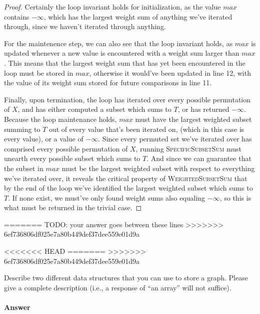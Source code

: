 \documentclass{article}
\begin{document}
\begin{enumerate}
\begin{proof}
			Certainly the loop invariant holds for initialization, as the value $max$ contains $-\infty$, which has
			the largest weight sum of anything we've iterated through, since we haven't iterated through anything.

			For the maintenence step, we can also see that the loop invariant holds, as $max$ is updated whenever
			a new value is encountered with a weight sum larger than $max$. This means that the largest weight sum
			that has yet been encountered in the loop must be stored in $max$, otherwise it would've been updated in
			line 12, with the value of its weight sum stored for future comparisons in line 11.

			Finally, upon termination, the loop has iterated over every possible permutation of $X$, and has either
			computed a subset which sums to $T$, or has returned $-\infty$. Because the loop maintenance holds, $max$
			must have the largest weighted subset summing to $T$ out of every value 
			that's been iterated on, (which in this case is every value), or a value 
			of $-\infty$. Since every permuted set we've iterated over has comprised every possible permutation of $X$,
			running \textsc{SpecificSubsetSum} must unearth every possible subset which sums to $T$. And since we can guarantee
			that the subset in $max$ must be the largest weighted subset with respect to everything we've iterated over,
			it reveals the critical property of \textsc{WeightedSubsetSum} that by the end of the loop we've identified the
			largest weighted subset which sums to $T$. If none exist, we must've only found weight sums also equaling $-\infty$,
			so this is what must be returned in the trivial case.
		\end{proof}






\end{enumerate}
=======
TODO: your answer goes between these lines
>>>>>>> 6ef736806df025e7a80b449def37dee559e01d9a




\nextprob
<<<<<<< HEAD
=======
>>>>>>> 6ef736806df025e7a80b449def37dee559e01d9a

Describe two different data structures that you can use to store a graph.
Please give a complete description (i.e., a response of ``an array'' will not
suffice).

\paragraph{Answer}
\end{document}
